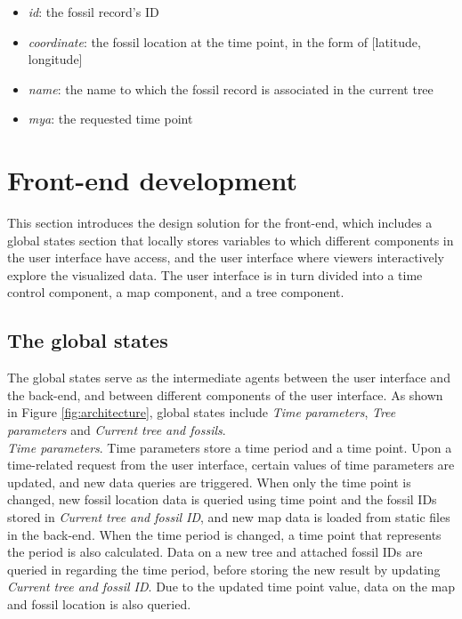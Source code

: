 \documentclass[11pt, a4paper,oneside,chapterprefix=false]{scrbook}
\begin{document}
\begin{itemize}
	\item \textit{id}: the fossil record's ID
	\item \textit{coordinate}: the fossil location at the time point, in the form of [latitude, longitude]
	\item \textit{name}: the name to which the fossil record is associated in the current tree
	\item \textit{mya}: the requested time point 
\end{itemize}

\section{Front-end development} \label{sec:tec_frontend}
This section introduces the design solution for the front-end, which includes a global states section that locally stores variables to which different components in the user interface have access, and the user interface where viewers interactively explore the visualized data. The user interface is in turn divided into a time control component, a map component, and a tree component. 
\subsection{The global states}\label{subsec:tec_frontend_global_states}
The global states serve as the intermediate agents between the user interface and the back-end, and between different components of the user interface. As shown in Figure \ref{fig:architecture}, global states include \emph{Time parameters}, \emph{Tree parameters} and \emph{Current tree and fossils}. \\

\emph{Time parameters}. Time parameters store a time period and a time point. Upon a time-related request from the user interface, certain values of time parameters are updated, and new data queries are triggered. When only the time point is changed, new fossil location data is queried using time point and the fossil IDs stored in \emph{Current tree and fossil ID}, and new map data is loaded from static files in the back-end. When the time period is changed, a time point that represents the period is also calculated. Data on a new tree and attached fossil IDs are queried in regarding the time period, before storing the new result by updating \emph{Current tree and fossil ID}. Due to the updated time point value, data on the map and fossil location is also queried. \\
\end{document}
